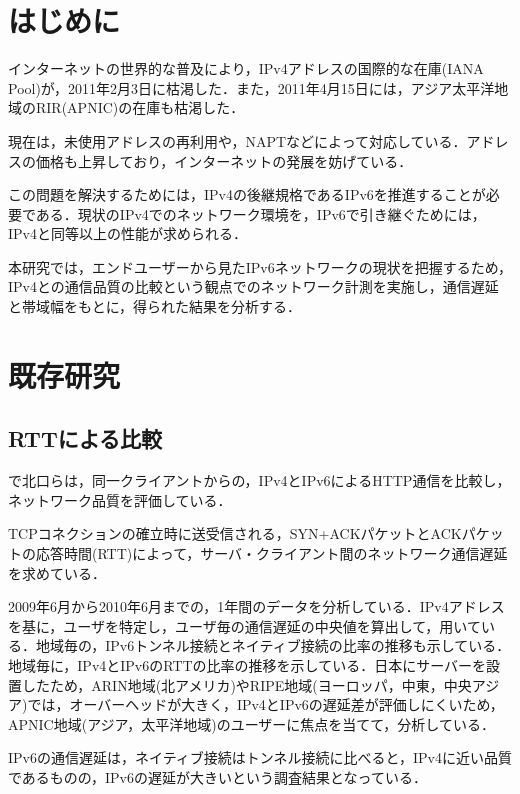 \documentclass[rinkou,a4paper]{ieicej}
\begin{document}
\maketitle

\section{はじめに}
インターネットの世界的な普及により，IPv4アドレスの国際的な在庫(IANA Pool)が，2011年2月3日に枯渇した．また，2011年4月15日には，アジア太平洋地域のRIR(APNIC)の在庫も枯渇した．

現在は，未使用アドレスの再利用や，NAPTなどによって対応している．アドレスの価格も上昇しており\cite{price}，インターネットの発展を妨げている．

この問題を解決するためには，IPv4の後継規格であるIPv6を推進することが必要である．現状のIPv4でのネットワーク環境を，IPv6で引き継ぐためには，IPv4と同等以上の性能が求められる．

本研究では，エンドユーザーから見たIPv6ネットワークの現状を把握するため，IPv4との通信品質の比較という観点でのネットワーク計測を実施し，通信遅延と帯域幅をもとに，得られた結果を分析する．

\section{既存研究}
\subsection{RTTによる比較}
\cite{kitaguchi1}で北口らは，同一クライアントからの，IPv4とIPv6によるHTTP通信を比較し，ネットワーク品質を評価している．

TCPコネクションの確立時に送受信される，SYN+ACKパケットとACKパケットの応答時間(RTT)によって，サーバ・クライアント間のネットワーク通信遅延を求めている．

2009年6月から2010年6月までの，1年間のデータを分析している．IPv4アドレスを基に，ユーザを特定し，ユーザ毎の通信遅延の中央値を算出して，用いている．地域毎の，IPv6トンネル接続とネイティブ接続の比率の推移も示している．地域毎に，IPv4とIPv6のRTTの比率の推移を示している．日本にサーバーを設置したため，ARIN地域(北アメリカ)やRIPE地域(ヨーロッパ，中東，中央アジア)では，オーバーヘッドが大きく，IPv4とIPv6の遅延差が評価しにくいため，APNIC地域(アジア，太平洋地域)のユーザーに焦点を当てて，分析している．

IPv6の通信遅延は，ネイティブ接続はトンネル接続に比べると，IPv4に近い品質であるものの，IPv6の遅延が大きいという調査結果となっている．
\end{document}
